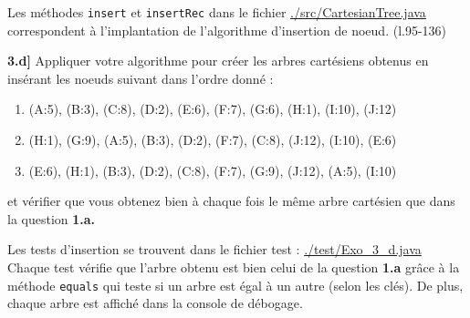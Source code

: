 \documentclass[a4paper,12pt]{report}
\begin{document}
\begin{tcolorbox}[colback=gray!10, colframe=blue!30, coltitle=black, title=Réponse à la 3.c - 1/1]

    Les méthodes \texttt{insert} et \texttt{insertRec} dans le fichier \href{./src/CartesianTree.java}{./src/CartesianTree.java} correspondent à 
        l'implantation de l'algorithme d'insertion de noeud. (l.95-136)

\end{tcolorbox}




\vspace{1.5cm}

\textbf{3.d]} Appliquer votre algorithme pour créer les arbres cartésiens obtenus en insérant les noeuds suivant dans l'ordre donné :
\begin{enumerate}
    \item (A:5), (B:3), (C:8), (D:2), (E:6), (F:7), (G:6), (H:1), (I:10), (J:12)
    \item (H:1), (G:9), (A:5), (B:3), (D:2), (F:7), (C:8), (J:12), (I:10), (E:6)
    \item (E:6), (H:1), (B:3), (D:2), (C:8), (F:7), (G:9), (J:12), (A:5), (I:10)
\end{enumerate}
et vérifier que vous obtenez bien à chaque fois le même arbre cartésien que dans la question \textbf{1.a.}



\begin{tcolorbox}[colback=gray!10, colframe=blue!30, coltitle=black, title=Réponse à la 3.d - 1/1]

    Les tests d'insertion se trouvent dans le fichier test : \href{./test/Exo\_3\_d.java}{./test/Exo\_3\_d.java}\\

    Chaque test vérifie que l'arbre obtenu est bien celui de la question \textbf{1.a} grâce à la méthode \texttt{equals} qui teste si un arbre est égal 
        à un autre (selon les clés). De plus, chaque arbre est affiché dans la console de débogage. 

\end{tcolorbox}
\end{document}
